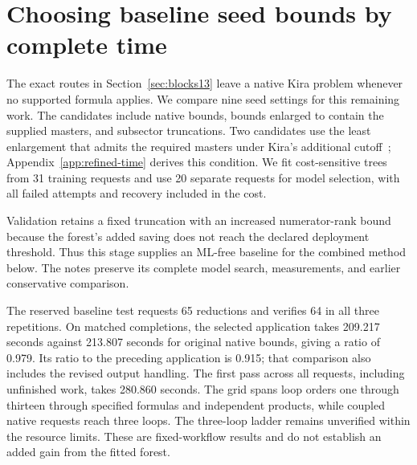 \section{Choosing baseline seed bounds by complete time}
\label{sec:refined-time}\label{sec:total-time}
The exact routes in Section~\ref{sec:blocks13} leave a native Kira problem whenever no supported formula applies. We compare nine seed settings for this remaining work. The candidates include native bounds, bounds enlarged to contain the supplied masters, and subsector truncations. Two candidates use the least enlargement that admits the required masters under Kira's additional cutoff~\cite{Kira3}; Appendix~\ref{app:refined-time} derives this condition. We fit cost-sensitive trees from 31 training requests and use 20 separate requests for model selection, with all failed attempts and recovery included in the cost.

Validation retains a fixed truncation with an increased numerator-rank bound because the forest's added saving does not reach the declared deployment threshold. Thus this stage supplies an ML-free baseline for the combined method below. The notes preserve its complete model search, measurements, and earlier conservative comparison.

The reserved baseline test requests 65 reductions and verifies 64 in all three repetitions. On matched completions, the selected application takes 209.217 seconds against 213.807 seconds for original native bounds, giving a ratio of 0.979. Its ratio to the preceding application is 0.915; that comparison also includes the revised output handling. The first pass across all requests, including unfinished work, takes 280.860 seconds. The grid spans loop orders one through thirteen through specified formulas and independent products, while coupled native requests reach three loops. The three-loop ladder remains unverified within the resource limits. These are fixed-workflow results and do not establish an added gain from the fitted forest.
